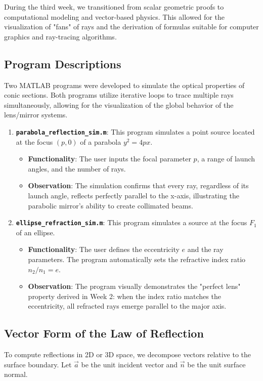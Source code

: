 \documentclass{article}
\begin{document}
During the third week, we transitioned from scalar geometric proofs to computational modeling and vector-based physics. This allowed for the visualization of "fans" of rays and the derivation of formulas suitable for computer graphics and ray-tracing algorithms.

\subsection{Program Descriptions}
Two MATLAB programs were developed to simulate the optical properties of conic sections. Both programs utilize iterative loops to trace multiple rays simultaneously, allowing for the visualization of the global behavior of the lens/mirror systems.

\begin{enumerate}
    \item \textbf{\texttt{parabola\_reflection\_sim.m}}: This program simulates a point source located at the focus $(p, 0)$ of a parabola $y^2 = 4px$.
    \begin{itemize}
        \item \textbf{Functionality}: The user inputs the focal parameter $p$, a range of launch angles, and the number of rays.
        \item \textbf{Observation}: The simulation confirms that every ray, regardless of its launch angle, reflects perfectly parallel to the x-axis, illustrating the parabolic mirror's ability to create collimated beams.
    \end{itemize}

    \item \textbf{\texttt{ellipse\_refraction\_sim.m}}: This program simulates a source at the focus $F_1$ of an ellipse.
    \begin{itemize}
        \item \textbf{Functionality}: The user defines the eccentricity $e$ and the ray parameters. The program automatically sets the refractive index ratio $n_2/n_1 = e$.
        \item \textbf{Observation}: The program visually demonstrates the "perfect lens" property derived in Week 2: when the index ratio matches the eccentricity, all refracted rays emerge parallel to the major axis.
    \end{itemize}
\end{enumerate}

\subsection{Vector Form of the Law of Reflection}
To compute reflections in 2D or 3D space, we decompose vectors relative to the surface boundary. Let $\vec{a}$ be the unit incident vector and $\vec{n}$ be the unit surface normal.
\end{document}
